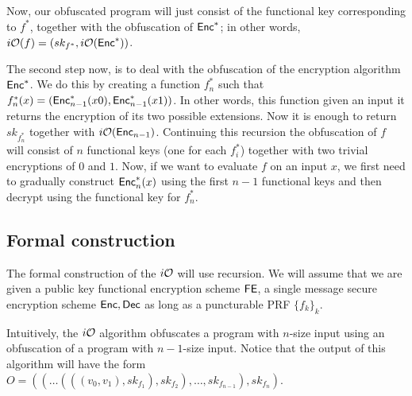 Now, our obfuscated program will just consist of the functional key corresponding to $f^*$, together with the obfuscation of $\mathsf{Enc}^*$; in other words, $i\mathcal{O}(f)=(sk_{f^*},i\mathcal{O}(\mathsf{Enc}^*))$.

The second step now, is to deal with the obfuscation of the encryption algorithm $\mathsf{Enc}^*$. We do this by creating a function $f^*_n$ such that $f^*_n(x)= (\mathsf{Enc}^*_{n-1}(x0),\mathsf{Enc}^*_{n-1}(x1))$. In other words, this function given an input it returns the encryption of its two possible extensions. Now it is enough to return $sk_{f^*_n}$ together with $i\mathcal{O}(\mathsf{Enc}_{n-1})$. Continuing this recursion the obfuscation of $f$ will consist of $n$ functional keys  (one for each $f^*_{i}$) together with two trivial encryptions of $0$ and $1$. Now, if we want to evaluate $f$ on an input $x$, we first need to gradually construct $\mathsf{Enc}^*_n(x)$ using the first $n-1$ functional keys and then decrypt using the functional key for $f^*_n$.

\subsection{Formal construction}
The formal construction of the $i\mathcal{O}$ will use recursion. We will assume that we are given a public key functional encryption scheme $\mathsf{FE}$, a single message secure encryption scheme $\mathsf{Enc},\mathsf{Dec}$ as long as a puncturable PRF $\{f_k\}_k$.

\begin{figure}[h!]
\centering
{}
\end{figure}
Intuitively, the $i\mathcal{O}$ algorithm obfuscates a program with $n$-size input using an obfuscation of a program with $n-1$-size input. Notice that the output of this algorithm will have the form $O=((\ldots(((v_0,v_1),sk_{f_1}),sk_{f_2}),\ldots,sk_{f_{n-1}}),sk_{f_n})$.


